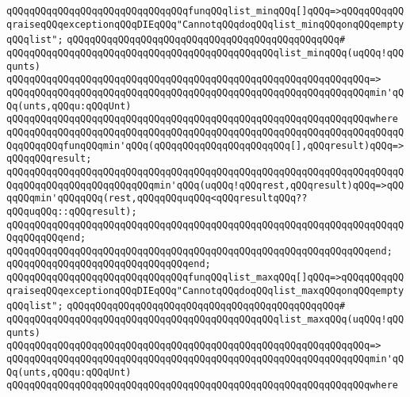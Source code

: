 \newline
\verb|qQQqqQQqqQQqqQQqqQQqqQQqqQQqqQQqfunqQQqlist_minqQQq[]qQQq=>qQQqqQQqqQQqraiseqQQqexceptionqQQqDIEqQQq"CannotqQQqdoqQQqlist_minqQQqonqQQqemptyqQQqlist";|\newline
\verb|qQQqqQQqqQQqqQQqqQQqqQQqqQQqqQQqqQQqqQQqqQQqqQQq#|\newline
\verb|qQQqqQQqqQQqqQQqqQQqqQQqqQQqqQQqqQQqqQQqqQQqqQQqlist_minqQQq(uqQQq!qQQqunts)|\newline
\verb|qQQqqQQqqQQqqQQqqQQqqQQqqQQqqQQqqQQqqQQqqQQqqQQqqQQqqQQqqQQqqQQq=>|\newline
\verb|qQQqqQQqqQQqqQQqqQQqqQQqqQQqqQQqqQQqqQQqqQQqqQQqqQQqqQQqqQQqqQQqmin'qQQq(unts,qQQqu:qQQqUnt)|\newline
\verb|qQQqqQQqqQQqqQQqqQQqqQQqqQQqqQQqqQQqqQQqqQQqqQQqqQQqqQQqqQQqqQQqwhere|\newline
\verb|qQQqqQQqqQQqqQQqqQQqqQQqqQQqqQQqqQQqqQQqqQQqqQQqqQQqqQQqqQQqqQQqqQQqqQQqqQQqqQQqfunqQQqmin'qQQq(qQQqqQQqqQQqqQQqqQQqqQQq[],qQQqresult)qQQq=>qQQqqQQqresult;|\newline
\verb|qQQqqQQqqQQqqQQqqQQqqQQqqQQqqQQqqQQqqQQqqQQqqQQqqQQqqQQqqQQqqQQqqQQqqQQqqQQqqQQqqQQqqQQqqQQqqQQqmin'qQQq(uqQQq!qQQqrest,qQQqresult)qQQq=>qQQqqQQqmin'qQQqqQQq(rest,qQQqqQQquqQQq<qQQqresultqQQq??qQQquqQQq::qQQqresult);|\newline
\verb|qQQqqQQqqQQqqQQqqQQqqQQqqQQqqQQqqQQqqQQqqQQqqQQqqQQqqQQqqQQqqQQqqQQqqQQqqQQqqQQqend;|\newline
\verb|qQQqqQQqqQQqqQQqqQQqqQQqqQQqqQQqqQQqqQQqqQQqqQQqqQQqqQQqqQQqqQQqend;|\newline
\verb|qQQqqQQqqQQqqQQqqQQqqQQqqQQqqQQqend;|\newline
\newline
\verb|qQQqqQQqqQQqqQQqqQQqqQQqqQQqqQQqfunqQQqlist_maxqQQq[]qQQq=>qQQqqQQqqQQqraiseqQQqexceptionqQQqDIEqQQq"CannotqQQqdoqQQqlist_maxqQQqonqQQqemptyqQQqlist";|\newline
\verb|qQQqqQQqqQQqqQQqqQQqqQQqqQQqqQQqqQQqqQQqqQQqqQQq#|\newline
\verb|qQQqqQQqqQQqqQQqqQQqqQQqqQQqqQQqqQQqqQQqqQQqqQQqlist_maxqQQq(uqQQq!qQQqunts)|\newline
\verb|qQQqqQQqqQQqqQQqqQQqqQQqqQQqqQQqqQQqqQQqqQQqqQQqqQQqqQQqqQQqqQQq=>|\newline
\verb|qQQqqQQqqQQqqQQqqQQqqQQqqQQqqQQqqQQqqQQqqQQqqQQqqQQqqQQqqQQqqQQqmin'qQQq(unts,qQQqu:qQQqUnt)|\newline
\verb|qQQqqQQqqQQqqQQqqQQqqQQqqQQqqQQqqQQqqQQqqQQqqQQqqQQqqQQqqQQqqQQqwhere|\newline
